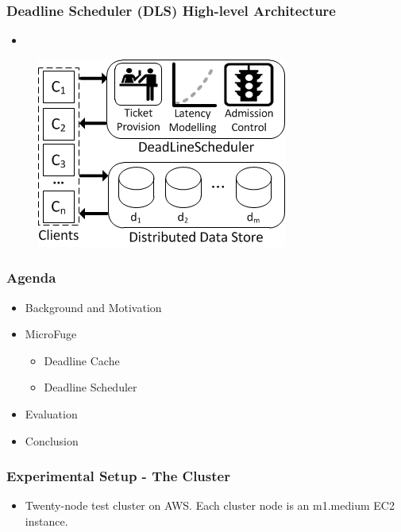 \documentclass{beamer}
\begin{document}
\begin{frame}
  \frametitle{Deadline Scheduler (DLS) High-level Architecture}
  \begin{itemize}
    \item
  \end{itemize}
  \begin{figure}
    \begin{center}
      \centerline{\includegraphics[scale=0.90]{img/DLS.png}}
    \end{center}
  \end{figure}
\end{frame}


\begin{frame}
  \frametitle{Agenda}
  \begin{itemize}
  \item[\Checkmark] Background and Motivation
  \item[\Checkmark] MicroFuge
    \begin{itemize}
    \item[\Checkmark] Deadline Cache
    \item[\Checkmark] Deadline Scheduler
    \end{itemize}
  \item Evaluation
  \item Conclusion
  \end{itemize}
\end{frame}


\begin{frame}
  \frametitle{Experimental Setup - The Cluster}
  \begin{itemize}
    \item Twenty-node test cluster on AWS. Each cluster node is an m1.medium
      EC2 instance.
  \end{itemize}
\end{frame}
\end{document}
